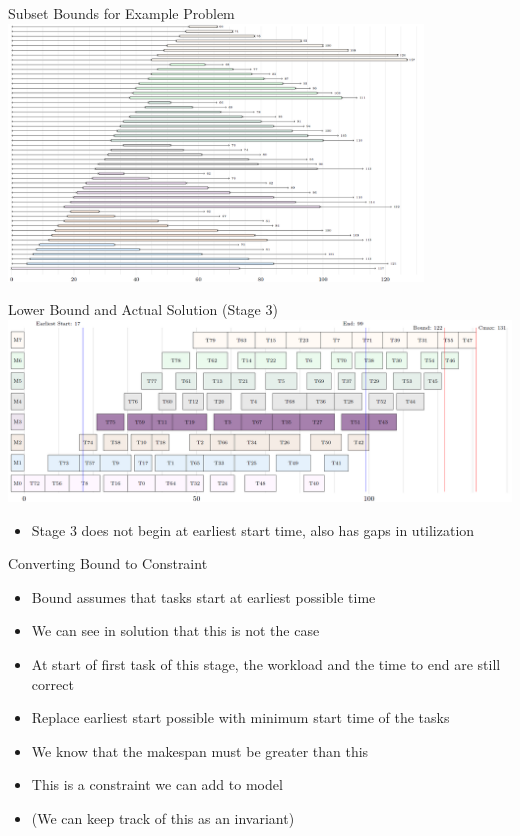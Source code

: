 \documentclass[dvipsnames,aspectratio=169]{beamer}
\begin{document}
\begin{frame}{Subset Bounds for Example Problem}
\includegraphics[width=11cm]{images/flowsubsetbounds.PNG}
\end{frame}

\begin{frame}{Lower Bound and Actual Solution (Stage 3)}
\includegraphics[width=14cm]{images/flowbound122scheduled.PNG}
\begin{itemize}
    \item Stage 3 does not begin at earliest start time, also has gaps in utilization
\end{itemize}
\end{frame}

\begin{frame}{Converting Bound to Constraint}
\begin{itemize}
    \item Bound assumes that tasks start at earliest possible time
    \item We can see in solution that this is not the case
    \item At start of first task of this stage, the workload and the time to end are still correct
    \item Replace earliest start possible with minimum start time of the tasks
    \item We know that the makespan must be greater than this
    \item This is a constraint we can add to model
    \item (We can keep track of this as an invariant)
\end{itemize}    
\end{frame}
\end{document}
